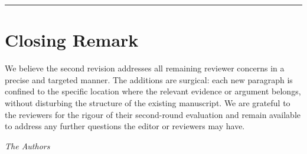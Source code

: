\documentclass[11pt,a4paper]{article}
\begin{document}
\bigskip
\hrule
\bigskip

\section*{Closing Remark}

We believe the second revision addresses all remaining reviewer concerns in a precise
and targeted manner. The additions are surgical: each new paragraph is confined to the
specific location where the relevant evidence or argument belongs, without disturbing
the structure of the existing manuscript. We are grateful to the reviewers for the
rigour of their second-round evaluation and remain available to address any further
questions the editor or reviewers may have.

\bigskip
\noindent\textit{The Authors}



\end{document}
